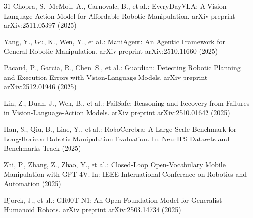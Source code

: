 \documentclass[a4paper]{Template/LaTeX_Templates/waica}
\begin{document}
\begin{thebibliography}{31}
Chopra, S., McMoil, A., Carnovale, B., et al.: EveryDayVLA: A Vision-Language-Action Model for Affordable Robotic Manipulation. arXiv preprint arXiv:2511.05397 (2025)

Yang, Y., Gu, K., Wen, Y., et al.: ManiAgent: An Agentic Framework for General Robotic Manipulation. arXiv preprint arXiv:2510.11660 (2025)

Pacaud, P., Garcia, R., Chen, S., et al.: Guardian: Detecting Robotic Planning and Execution Errors with Vision-Language Models. arXiv preprint arXiv:2512.01946 (2025)

Lin, Z., Duan, J., Wen, B., et al.: FailSafe: Reasoning and Recovery from Failures in Vision-Language-Action Models. arXiv preprint arXiv:2510.01642 (2025)

Han, S., Qiu, B., Liao, Y., et al.: RoboCerebra: A Large-Scale Benchmark for Long-Horizon Robotic Manipulation Evaluation. In: NeurIPS Datasets and Benchmarks Track (2025)

Zhi, P., Zhang, Z., Zhao, Y., et al.: Closed-Loop Open-Vocabulary Mobile Manipulation with GPT-4V. In: IEEE International Conference on Robotics and Automation (2025)

Bjorck, J., et al.: GR00T N1: An Open Foundation Model for Generalist Humanoid Robots. arXiv preprint arXiv:2503.14734 (2025)
\end{thebibliography}
\end{document}
